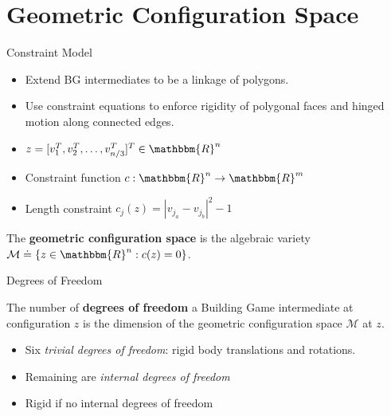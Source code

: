 \documentclass{beamer}
\begin{document}
\section{Geometric Configuration Space}
\begin{frame}{Constraint Model}
\begin{itemize}
\item Extend BG intermediates to be a linkage of polygons.
\item Use constraint equations to enforce rigidity of polygonal faces and hinged motion along connected edges.
\item $z = [v_1^T, v_2^T, \dots, v_{n/3}^T]^T \in \mathbbm{R}^n$
\item Constraint function $c: \mathbbm{R}^n \to \mathbbm{R}^m$
\item Length constraint $c_j(z) = |v_{j_a} - v_{j_b}|^2 - 1$
\end{itemize}
\begin{definition}
The \textbf{geometric configuration space} is the algebraic variety $\mathcal{M} \doteq \{z \in \mathbbm{R}^n: c(z) = 0\}$. 
\end{definition}

\end{frame}
\begin{frame}{Degrees of Freedom}
\begin{definition}
The number of \textbf{degrees of freedom} a Building Game intermediate at configuration $z$ is the dimension of the geometric configuration space $\mathcal{M}$ at $z$. 
\end{definition}
\begin{itemize}
\item Six \textit{trivial degrees of freedom}: rigid body translations and rotations. 
\item Remaining are \textit{internal degrees of freedom}
\item Rigid if no internal degrees of freedom
\end{itemize}
\end{frame}
\end{document}
